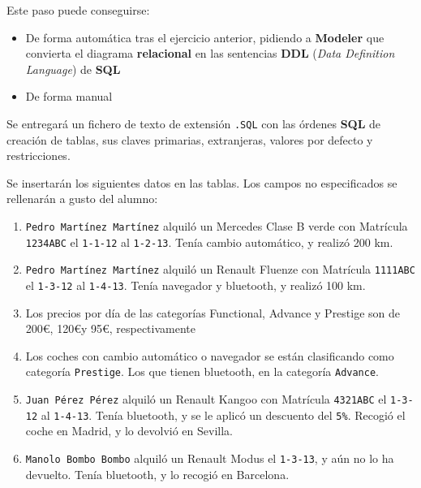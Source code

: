 \begin{homeworkProblem}
  Este paso puede conseguirse:
  \begin{itemize}
  \item De forma automática tras el ejercicio anterior, pidiendo a \textbf{Modeler} que convierta el diagrama \textbf{relacional} en las sentencias \textbf{DDL} (\textit{Data Definition Language}) de \textbf{SQL}
  \item De forma manual
  \end{itemize}

  Se entregará un fichero de texto de extensión \texttt{.SQL} con las órdenes \textbf{SQL} de creación de tablas, sus claves primarias, extranjeras, valores por defecto y restricciones.

\end{homeworkProblem}



\begin{homeworkProblem}
  Se insertarán los siguientes datos en las tablas. Los campos no especificados se
  rellenarán a gusto del alumno:

  \begin{enumerate}
  \item  \texttt{Pedro Martínez Martínez} alquiló un Mercedes Clase B verde con
    Matrícula \texttt{1234ABC} el \texttt{1-1-12} al \texttt{1-2-13}. Tenía cambio automático, y
    realizó 200 km.
  \item  \texttt{Pedro Martínez Martínez} alquiló un Renault Fluenze con Matrícula
    \texttt{1111ABC} el \texttt{1-3-12} al \texttt{1-4-13}. Tenía navegador y bluetooth, y realizó
    100 km.
  \item  Los precios por día de las categorías Functional, Advance y Prestige
    son de 200\euro, 120\euro y 95\euro, respectivamente

  \item  Los coches con cambio automático o navegador se están clasificando
    como categoría \texttt{Prestige}. Los que tienen bluetooth, en la categoría
    \texttt{Advance}.
  \item  \texttt{Juan Pérez Pérez} alquiló un Renault Kangoo con Matrícula \texttt{4321ABC} el
    \texttt{1-3-12} al \texttt{1-4-13}. Tenía bluetooth, y se le aplicó un descuento del \texttt{5\%}.
    Recogió el coche en Madrid, y lo devolvió en Sevilla.
  \item  \texttt{Manolo Bombo Bombo} alquiló un Renault Modus el \texttt{1-3-13}, y aún no lo
    ha devuelto. Tenía bluetooth, y lo recogió en Barcelona.
  \end{enumerate}
\end{homeworkProblem}


